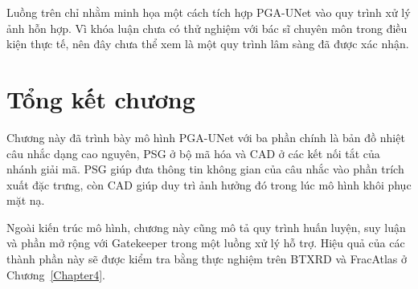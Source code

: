 Luồng trên chỉ nhằm minh họa một cách tích hợp PGA-UNet vào quy trình xử lý ảnh hỗn hợp. Vì khóa luận chưa có thử nghiệm với bác sĩ chuyên môn trong điều kiện thực tế, nên đây chưa thể xem là một quy trình lâm sàng đã được xác nhận.

\section{Tổng kết chương}
\label{sec:summary_ch3}

Chương này đã trình bày mô hình PGA-UNet với ba phần chính là bản đồ nhiệt câu nhắc dạng cao nguyên, PSG ở bộ mã hóa và CAD ở các kết nối tắt của nhánh giải mã. PSG giúp đưa thông tin không gian của câu nhắc vào phần trích xuất đặc trưng, còn CAD giúp duy trì ảnh hưởng đó trong lúc mô hình khôi phục mặt nạ.

Ngoài kiến trúc mô hình, chương này cũng mô tả quy trình huấn luyện, suy luận và phần mở rộng với Gatekeeper trong một luồng xử lý hỗ trợ. Hiệu quả của các thành phần này sẽ được kiểm tra bằng thực nghiệm trên BTXRD và FracAtlas ở Chương~\ref{Chapter4}.
